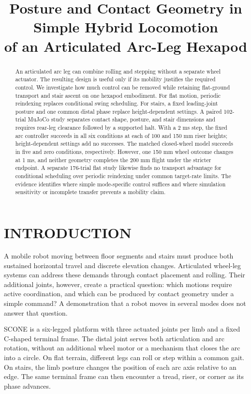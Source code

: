 \documentclass[letterpaper,10pt,conference]{ieeeconf}
\title{\LARGE\bf Posture and Contact Geometry in Simple Hybrid Locomotion\\of an Articulated Arc-Leg Hexapod}
\author{\mbox{}}
\begin{document}
\maketitle\thispagestyle{empty}\pagestyle{empty}
\begin{abstract}
An articulated arc leg can combine rolling and stepping without a separate wheel actuator. The resulting design is useful only if its mobility justifies the required control. We investigate how much control can be removed while retaining flat-ground transport and stair ascent on one hexapod embodiment. For flat motion, periodic reindexing replaces conditional swing scheduling. For stairs, a fixed leading-joint posture and one common distal phase replace height-dependent settings. A paired 102-trial MuJoCo study separates contact shape, posture, and stair dimensions and requires rear-leg clearance followed by a supported halt. With a 2 ms step, the fixed arc controller succeeds in all six conditions at each of 100 and 150 mm riser heights; height-dependent settings add no successes. The matched closed-wheel model succeeds in five and zero conditions, respectively. However, one 150 mm wheel outcome changes at 1 ms, and neither geometry completes the 200 mm flight under the stricter endpoint. A separate 176-trial flat study likewise finds no transport advantage for conditional scheduling over periodic reindexing under common target-rate limits. The evidence identifies where simple mode-specific control suffices and where simulation sensitivity or incomplete transfer prevents a mobility claim.
\end{abstract}

\section{INTRODUCTION}
A mobile robot moving between floor segments and stairs must produce both sustained horizontal travel and discrete elevation changes. Articulated wheel-leg systems can address these demands through contact placement and rolling. Their additional joints, however, create a practical question: which motions require active coordination, and which can be produced by contact geometry under a simple command? A demonstration that a robot moves in several modes does not answer that question.

SCONE is a six-legged platform with three actuated joints per limb and a fixed C-shaped terminal frame. The distal joint serves both articulation and arc rotation, without an additional wheel motor or a mechanism that closes the arc into a circle. On flat terrain, different legs can roll or step within a common gait. On stairs, the limb posture changes the position of each arc axis relative to an edge. The same terminal frame can then encounter a tread, riser, or corner as its phase advances.
\end{document}
